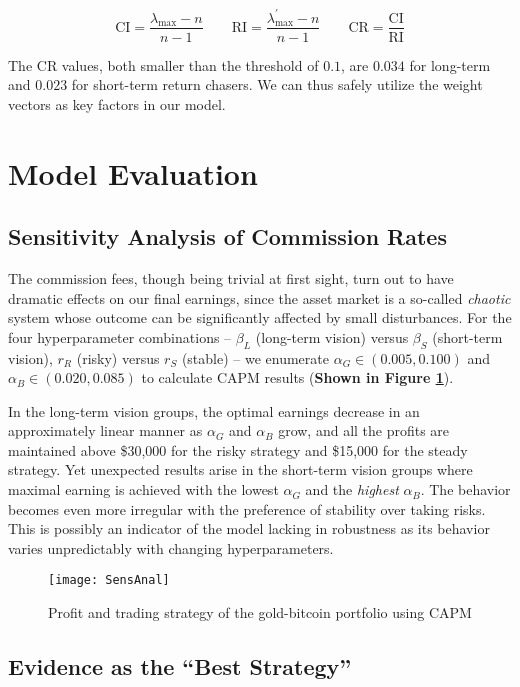 \documentclass{mcmthesis}
\begin{document}
{	\[ \mathrm{CI}=\frac{\lambda_{\max}-n}{n-1} \qquad \mathrm{RI}=\frac{\lambda^{\prime}_{\max}-n}{n-1} \qquad
	\mathrm{CR}=\frac{\mathrm{CI}}{\mathrm{RI}} \]
	
	The $ \mathrm{CR}$ values, both smaller than the threshold of $0.1$, are $0.034$ for long-term and $0.023$ for short-term return chasers. We can thus safely utilize the weight vectors as key factors in our model. 
	
	\section{Model Evaluation}
	\subsection{Sensitivity Analysis of Commission Rates}
	
	The commission fees, though being trivial at first sight, turn out to have dramatic effects on our final earnings, since the asset market is a so-called \textit{chaotic} system whose outcome can be significantly affected by small disturbances. For the four hyperparameter combinations -- $\beta_L$ (long-term vision) versus $\beta_S$ (short-term vision), $r_R$ (risky) versus $r_S$ (stable) -- we enumerate $\alpha_G \in \left( 0.005, 0.100 \right)$ and $\alpha_B \in \left( 0.020, 0.085 \right)$ to calculate CAPM results (\textbf{Shown in Figure \ref{fig:14}}). 
	
	In the long-term vision groups, the optimal earnings decrease in an approximately linear manner as $\alpha_G$ and $\alpha_B$ grow, and all the profits are maintained above \$30,000 for the risky strategy and \$15,000 for the steady strategy. Yet unexpected results arise in the short-term vision groups where maximal earning is achieved with the lowest $\alpha_G$ and the \textit{highest} $\alpha_B$. The behavior becomes even more irregular with the preference of stability over taking risks. This is possibly an indicator of the model lacking in robustness as its behavior varies unpredictably with changing hyperparameters. 
	
	\begin{figure}[h]
		\label {fig:14}
		\centering \texttt{[image: SensAnal]}
		\caption{Profit and trading strategy of the gold-bitcoin portfolio using CAPM}
	\end{figure}
	
	\subsection{Evidence as the ``Best Strategy''}
	
}
\end{document}
